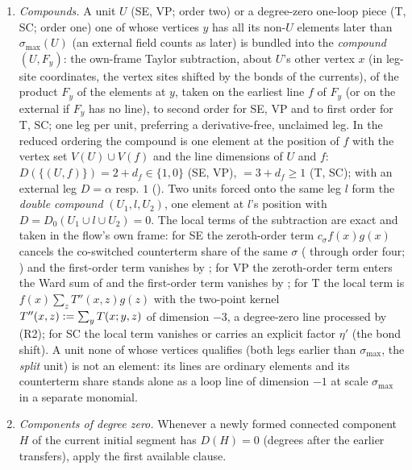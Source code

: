 \begin{definition}
\begin{enumerate}[label=\textup{(R\arabic*)},leftmargin=*]
\item\emph{Compounds.} A unit $U$ (SE, VP; order two) or a degree-zero one-loop piece (T, SC; order one) one of whose vertices $y$ has all its non-$U$ elements later than $\sigma_{\max}(U)$ (an external field counts as later) is bundled into the \emph{compound} $(U,F_y)$: the own-frame Taylor subtraction, about $U$'s other vertex $x$ (in leg-site coordinates, the vertex sites shifted by the bonds of the currents), of the product $F_y$ of the elements at $y$, taken on the earliest line $f$ of $F_y$ (or on the external if $F_y$ has no line), to second order for SE, VP and to first order for T, SC; one leg per unit, preferring a derivative-free, unclaimed leg. In the reduced ordering the compound is one element at the position of $f$ with the vertex set $V(U)\cup V(f)$ and the line dimensions of $U$ and $f$: $D(\{(U,f)\})=2+d_f\in\{1,0\}$ (SE, VP), $=3+d_f\ge1$ (T, SC); with an external leg $D=\alpha$ resp. $1$ (). Two units forced onto the same leg $l$ form the \emph{double compound} $(U_1,l,U_2)$, one element at $l$'s position with $D=D_0(U_1\cup l\cup U_2)=0$. The local terms of the subtraction are exact and taken in the flow's own frame: for SE the zeroth-order term $c_\sigma f(x)g(x)$ cancels the co-switched counterterm share of the same $\sigma$ (\cite[(3.33)]{K1} through order four; ) and the first-order term vanishes by ; for VP the zeroth-order term enters the Ward sum of  and the first-order term vanishes by ; for T the local term is $f(x)\sum_zT''(x,z)g(z)$ with the two-point kernel $T''(x,z):=\sum_yT(x;y,z)$ of dimension $-3$, a degree-zero line processed by (R2); for SC the local term vanishes or carries an explicit factor $\eta'$ (the bond shift). A unit none of whose vertices qualifies (both legs earlier than $\sigma_{\max}$, the \emph{split} unit) is not an element: its lines are ordinary elements and its counterterm share stands alone as a loop line of dimension $-1$ at scale $\sigma_{\max}$ in a separate monomial.
\item\emph{Components of degree zero.} Whenever a newly formed connected component $H$ of the current initial segment has $D(H)=0$ (degrees after the earlier transfers), apply the first available clause.
\begin{enumerate}[label=\textup{(\alph*)},leftmargin=*]

\end{enumerate}
\end{enumerate}
\end{definition}
